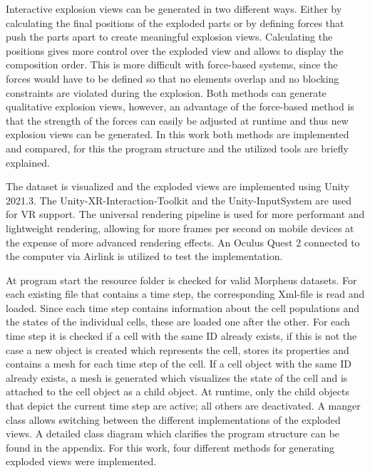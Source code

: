Interactive explosion views can be generated in two different ways. 
Either by calculating the final positions of the exploded parts or by defining forces that push the parts apart to create meaningful explosion views.
Calculating the positions gives more control over the exploded view and allows to display the composition order. 
This is more difficult with force-based systems, since the forces would have to be defined so that no elements overlap and no blocking constraints are violated during the explosion. 
Both methods can generate qualitative explosion views, however, an advantage of the force-based method is that the strength of the forces can easily be adjusted at runtime and thus new explosion views can be generated. 
In this work both methods are implemented and compared, for this the program structure and the utilized tools are briefly explained. 

The dataset is visualized and the exploded views are implemented using Unity 2021.3. %
The Unity-XR-Interaction-Toolkit and the Unity-InputSystem are used for VR support. %
The universal rendering pipeline is used for more performant and lightweight rendering, allowing for more frames per second on mobile devices at the expense of more advanced rendering effects. %
An Oculus Quest 2 connected to the computer via Airlink is utilized to test the implementation. %

At program start the resource folder is checked for valid Morpheus datasets.
For each existing file that contains a time step, the corresponding Xml-file is read and loaded. 
Since each time step contains information about the cell populations and the states of the individual cells, these are loaded one after the other.
For each time step it is checked if a cell with the same ID already exists, if this is not the case a new object is created which represents the cell, stores its properties and contains a mesh for each time step of the cell. 
If a cell object with the same ID already exists, a mesh is generated which visualizes the state of the cell and is attached to the cell object as a child object.
At runtime, only the child objects that depict the current time step are active; all others are deactivated.
A manger class allows switching between the different implementations of the exploded views. 
A detailed class diagram which clarifies the program structure can be found in the appendix. %
For this work, four different methods for generating exploded views were implemented.

